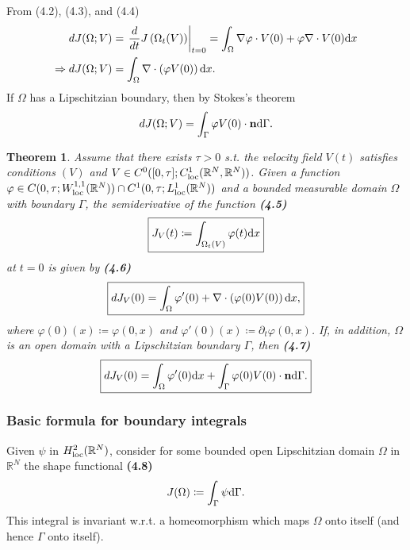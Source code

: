 \documentclass[oneside]{book}
\numberwithin{equation}{section}
\newtheorem{theorem}{Theorem}[section]
\begin{document}
%
From (4.2), (4.3), and (4.4)
\begin{align*}
    dJ(\Omega;V) &= \left.\frac{d}{dt}J\left(\Omega_t(V)\right)\right|_{t = 0} = \int_\Omega \nabla\varphi\cdot V(0) + \varphi\nabla\cdot V(0){\rm d}x\\
    \Rightarrow dJ(\Omega;V) &= \int_\Omega \nabla\cdot\left(\varphi V(0)\right){\rm d}x.
\end{align*}
If $\Omega$ has a Lipschitzian boundary, then by Stokes's theorem
\begin{align*}
    dJ(\Omega;V) = \int_\Gamma \varphi V(0)\cdot{\bf n}{\rm d}\Gamma.
\end{align*}

\begin{theorem}
    Assume that there exists $\tau > 0$ s.t. the velocity field $V(t)$ satisfies conditions $(V)$ and $V\in C^0([0,\tau];C_{\rm loc}^1(\mathbb{R}^N,\mathbb{R}^N))$. Given a function $\varphi\in C(0,\tau;W_{\rm loc}^{1,1}(\mathbb{R}^N))\cap C^1(0,\tau;L_{\rm loc}^1(\mathbb{R}^N))$ and a bounded measurable domain $\Omega$ with boundary $\Gamma$, the semiderivative of the function \textbf{(4.5)}
    \begin{align*}
        \boxed{J_V(t)\coloneqq\int_{\Omega_t(V)} \varphi(t){\rm d}x}
    \end{align*}
    at $t = 0$ is given by \textbf{(4.6)}
    \begin{align*}
        \boxed{dJ_V(0) = \int_\Omega \varphi'(0) + \nabla\cdot\left(\varphi(0)V(0)\right){\rm d}x,}
    \end{align*}
    where $\varphi(0)(x)\coloneqq\varphi(0,x)$ and $\varphi'(0)(x)\coloneqq\partial_t\varphi(0,x)$. If, in addition, $\Omega$ is an open domain with a Lipschitzian boundary $\Gamma$, then \textbf{(4.7)}
    \begin{align*}
        \boxed{dJ_V(0) = \int_\Omega \varphi'(0){\rm d}x + \int_\Gamma \varphi(0)V(0)\cdot{\bf n}{\rm d}\Gamma.}
    \end{align*}
\end{theorem}

\subsubsection{Basic formula for boundary integrals}
Given $\psi$ in $H_{\rm loc}^2(\mathbb{R}^N)$, consider for some bounded open Lipschitzian domain $\Omega$ in $\mathbb{R}^N$ the shape functional \textbf{(4.8)}
\begin{align*}
    J(\Omega)\coloneqq\int_\Gamma \psi{\rm d}\Gamma.
\end{align*}
This integral is invariant w.r.t. a homeomorphism which maps $\Omega$ onto itself (and hence $\Gamma$ onto itself).
\end{document}

